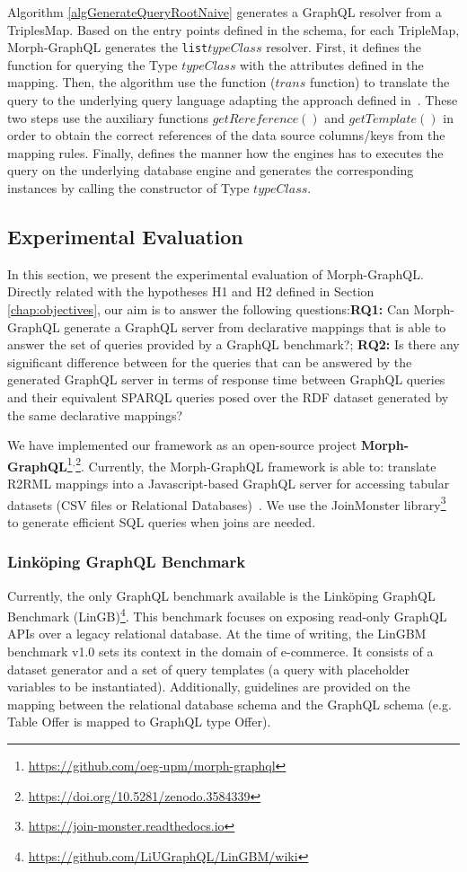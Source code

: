 Algorithm \ref{algGenerateQueryRootNaive} generates a GraphQL resolver from a TriplesMap. Based on the entry points defined in the schema, for each TripleMap, Morph-GraphQL generates the \texttt{list$typeClass$} resolver. First, it defines the function for querying the Type $typeClass$ with the attributes defined in the mapping. Then, the algorithm use the function ($trans$ function) to translate the query to the underlying query language adapting the approach defined in~\citep{chebotko2009semantics}. These two steps use the auxiliary functions $getRereference()$ and $getTemplate()$ in order to obtain the correct references of the data source columns/keys from the mapping rules. Finally, defines the manner how the engines has to executes the query on the underlying database engine and generates the corresponding instances by calling the constructor of Type $typeClass$.




\subsection{Experimental Evaluation}
In this section, we present the experimental evaluation of Morph-GraphQL. Directly related with the hypotheses H1 and H2 defined in Section \ref{chap:objectives}, our aim is to answer the following questions:\textbf{RQ1:} Can Morph-GraphQL generate a GraphQL server from declarative mappings that is able to answer the set of queries provided by a GraphQL benchmark?; \textbf{RQ2:} Is there any significant difference between for the queries that can be answered by the generated GraphQL server in terms of response time between GraphQL queries and their equivalent SPARQL queries posed over the RDF dataset generated by the same declarative mappings?

We have implemented our framework as an open-source project \textbf{Morph-GraphQL}\footnote{\url{https://github.com/oeg-upm/morph-graphql}}$^,$\footnote{\url{https://doi.org/10.5281/zenodo.3584339}}. Currently, the Morph-GraphQL framework is able to: translate R2RML mappings into a Javascript-based GraphQL server for accessing tabular datasets (CSV files or Relational Databases)~\citep{priyatna2019morph}. We use the JoinMonster library\footnote{\url{https://join-monster.readthedocs.io}} to generate efficient SQL queries when joins are needed.

\subsubsection{Link\"{o}ping GraphQL Benchmark} 
Currently, the only GraphQL benchmark available is the Link\"{o}ping GraphQL Benchmark (LinGB)\footnote{\url{https://github.com/LiUGraphQL/LinGBM/wiki}}. This benchmark focuses on exposing read-only GraphQL APIs over a legacy relational database. At the time of writing, the LinGBM benchmark v1.0 sets its context in the domain of e-commerce. It consists of a dataset generator and a set of query templates (a query with placeholder variables to be instantiated). Additionally, guidelines are provided on the mapping between the relational database schema and the GraphQL schema (e.g. Table Offer is mapped to GraphQL type Offer). 

